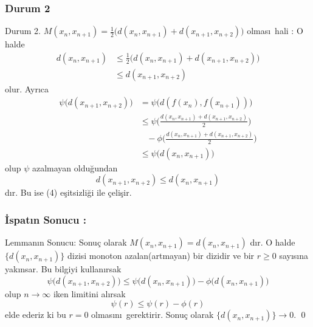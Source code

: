 \documentclass[8pt]{beamer}
\begin{document}
\subsubsection{Durum 2} 
\begin{frame} 
  \begin{block}{Durum 2.  $M(x_n,x_{n+1})=\frac{1}{2}\big(d(x_n,x_{n+1})+d(x_{n+1},x_{n+2})\big)$ olmas\i\ hali :}
O halde 
      \begin{align}
        d(x_n,x_{n+1})&\leq \frac{1}{2}\big(d(x_n,x_{n+1})+d(x_{n+1},x_{n+2})\big)\\
                    &\leq d(x_{n+1},x_{n+2}) 
      \end{align}
olur. Ayr\i ca 
      \begin{align}
          \psi\big(d(x_{n+1},x_{n+2})\big) &=\psi \big(d(f(x_{n}),f(x_{n+1}))\big) \\
          &\leq \psi\bigg(\frac{d(x_n,x_{n+1})+d(x_{n+1},x_{n+2})}{2}\bigg) \\
          & \hspace{10pt}- \phi\bigg(\frac{d(x_n,x_{n+1})+d(x_{n+1},x_{n+2})}{2}\bigg) \\
          &\leq \psi\big(d(x_{n},x_{n+1})\big)
      \end{align}
olup $\psi $ azalmayan oldu\u{g}undan $$d(x_{n+1},x_{n+2})\leq d(x_n,x_{n+1})$$ d\i r. Bu ise (4) e\c{s}itsizli\u{g}i ile \c{c}eli\c{s}ir.
   \end{block}
\end{frame}%


\subsubsection{ \.{I}spat\i n Sonucu :} 
\begin{frame} 
  \begin{block}{Lemman\i n Sonucu:}
Sonu\c{c} olarak  $M(x_{n},x_{n+1})= d(x_n,x_{n+1})$ d\i r. O halde $\{d(x_n,x_{n+1})\}$ dizisi monoton azalan(artmayan) bir dizidir ve bir $r\geq 0$ say\i s\i na yak\i nsar. Bu bilgiyi kullan\i rsak $$\psi\big(d(x_{n+1},x_{n+2})\big)\leq \psi\big(d(x_{n},x_{n+1})\big)-\phi\big(d(x_{n},x_{n+1})\big)$$ olup $n\to \infty$ iken limitini al\i rsak $$\psi(r)\leq \psi(r)-\phi(r)$$ elde ederiz ki bu $r=0$ olmas\i n\i\ gerektirir. Sonu\c{c} olarak $\{d(x_n,x_{n+1})\}\to 0$. \qed
   \end{block}
\end{frame}%
\end{document}
